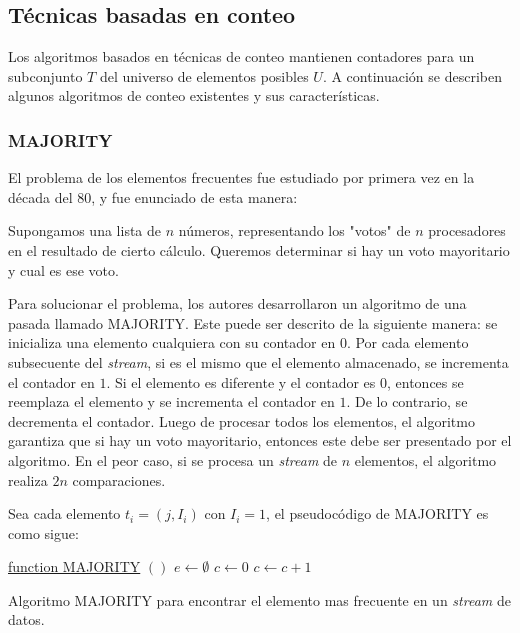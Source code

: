\documentclass[a4paper,12pt, oneside]{article}
\begin{document}
\subsection{Técnicas basadas en conteo}\label{tecnicas_conteo}

Los algoritmos basados en técnicas de conteo mantienen contadores para un subconjunto $T$ del universo de elementos posibles $U$. A continuación se describen algunos algoritmos de conteo existentes y sus características.

\subsubsection{MAJORITY}
El problema de los elementos frecuentes fue estudiado por primera vez en la década del 80, y fue enunciado de esta manera:
\begin{displayquote}
	Supongamos una lista de $n$ números, representando los "votos" de $n$ procesadores en el resultado de cierto cálculo. Queremos determinar si hay un voto mayoritario y cual es ese voto.\cite{GUIBAS1981208}
\end{displayquote}

Para solucionar el problema, los autores desarrollaron un algoritmo de una pasada llamado MAJORITY. Este puede ser descrito de la siguiente manera: se inicializa una elemento cualquiera con su contador en $0$. Por cada elemento subsecuente del \textit{stream}, si es el mismo que el elemento almacenado, se incrementa el contador en $1$. Si el elemento es diferente y el contador es $0$, entonces se reemplaza el elemento y se incrementa el contador en $1$. De lo contrario, se decrementa el contador. Luego de procesar todos los elementos, el algoritmo garantiza que si hay un voto mayoritario, entonces este debe ser presentado por el algoritmo. En el peor caso, si se procesa un \textit{stream} de $n$ elementos, el algoritmo realiza $2n$ comparaciones.

Sea cada elemento $t_i = (j, I_i)$ con $I_i = 1$, el pseudocódigo de MAJORITY es como sigue:

\begin{algorithm}
	
	\underline{function MAJORITY} $()$\;
	$e \leftarrow \emptyset$\; $c \leftarrow 0$\;
	{
		{
			$c \leftarrow c + 1$\;
		}{
		}
	}
	\caption{Algoritmo MAJORITY para encontrar el elemento mas frecuente en un \textit{stream} de datos.}
	\label{alg:majority}
\end{algorithm}
\end{document}
